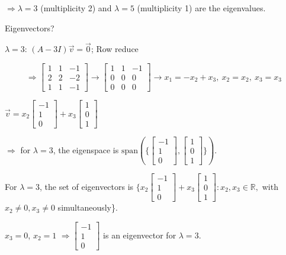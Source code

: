 \documentclass{article}
\begin{document}
\(\Rightarrow \lambda = 3\) (multiplicity 2) and \(\lambda = 5\) (multiplicity 1) are the eigenvalues.

Eigenvectors?

\(\lambda = 3\): \((A-3I)\vec{v} = \vec{0}\); Row reduce

\[
\Rightarrow \begin{bmatrix} 1 & 1 & -1 \\ 2 & 2 & -2 \\ 1 & 1 & -1 \end{bmatrix} \rightarrow \begin{bmatrix} 1 & 1 & -1 \\ 0 & 0 & 0 \\ 0 & 0 & 0 \end{bmatrix} \rightarrow x_1 = -x_2 + x_3, \ x_2 = x_2, \ x_3 = x_3
\]

\(\vec{v} = x_2\begin{bmatrix} -1 \\ 1 \\ 0 \end{bmatrix} + x_3\begin{bmatrix} 1 \\ 0 \\ 1 \end{bmatrix}\)

\(\Rightarrow\) for \(\lambda = 3\), the eigenspace is \(\text{span}(\{\begin{bmatrix} -1 \\ 1 \\ 0 \end{bmatrix}, \begin{bmatrix} 1 \\ 0 \\ 1 \end{bmatrix}\})\).

For \(\lambda = 3\), the set of eigenvectors is \(\{x_2\begin{bmatrix} -1 \\ 1 \\ 0 \end{bmatrix} + x_3\begin{bmatrix} 1 \\ 0 \\ 1 \end{bmatrix} : x_2, x_3 \in \mathbb{R},\) with \(x_2 \neq 0, x_3 \neq 0\) simultaneously\}.

\(x_3 = 0\), \(x_2 = 1\) \(\Rightarrow \begin{bmatrix} -1 \\ 1 \\ 0 \end{bmatrix}\) is an eigenvector for \(\lambda = 3\).
\end{document}
